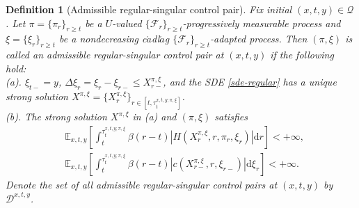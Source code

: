 \documentclass[10pt,a4paper]{amsart}
\newtheorem{definition}{Definition}
\begin{document}
\begin{definition}[Admissible regular-singular control pair]\label{admissible2}
Fix initial $(x,t,y)\in\mathcal{Q}$. Let $\pi=\{\pi_{r}\}_{r\ge t}$ be a $U$-valued $\{\mathcal{F}_{r}\}_{r\ge t}$-progressively measurable process and $\xi=\{\xi_{r}\}_{r\ge t}$ be a nondecreasing c$\acute{a}$dl$\acute{a}$g $\{\mathcal{F}_{r}\}_{r\ge t}$-adapted process. Then $(\pi,\xi)$ is called an admissible regular-singular control pair at $(x,t,y)$ if the following hold:\\
(a). $\xi_{t-}=y$, $\Delta \xi_r=\xi_r-\xi_{r-}\le X_{r-}^{\pi,\xi}$, and the SDE \eqref{sde-regular} has a unique strong solution $X^{\pi,\xi}=\{X^{\pi,\xi}_{r}\}_{r\in [t,\tau^{x,t,y;\pi,\xi}_{t}]}$.\\
(b). The strong solution $X^{\pi,\xi}$ in (a) and $(\pi,\xi)$ satisfies
\begin{equation}
\begin{aligned}
&\mathbb{E}_{x, t, y}\left[\int_t^{\tau^{x,t,y;\pi,\xi}_{t}} \beta(r-t) \left|H\left(X_r^{\pi,\xi}, r, \pi_r, \xi_r \right)\right| \mathrm{d} r\right]<+\infty,\\
&\mathbb{E}_{x, t, y}\left[\int_t^{\tau^{x,t,y;\pi,\xi}_{t}} \beta(r-t) \left|c\left(X_{r-}^{\pi,\xi}, r, \xi_{r-}\right)\right| \mathrm{d} \xi_r\right]<+\infty.
\end{aligned}\nonumber
\end{equation}
Denote the set of all admissible regular-singular control pairs at $(x,t,y)$ by $\mathcal{D}^{x,t,y}$. 


\end{definition}
\end{document}
